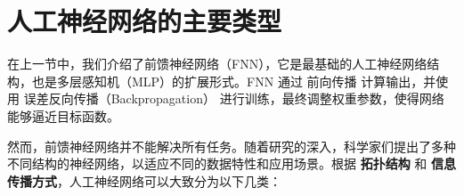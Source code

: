 %
%
%  
%
%

\section{人工神经网络的主要类型}
在上一节中，我们介绍了前馈神经网络（FNN），它是最基础的人工神经网络结构，也是多层感知机（MLP）的扩展形式。FNN 通过 前向传播 计算输出，并使用 误差反向传播（Backpropagation） 进行训练，最终调整权重参数，使得网络能够逼近目标函数。

然而，前馈神经网络并不能解决所有任务。随着研究的深入，科学家们提出了多种不同结构的神经网络，以适应不同的数据特性和应用场景。根据 {\bf 拓扑结构} 和 {\bf 信息传播方式}，人工神经网络可以大致分为以下几类：

